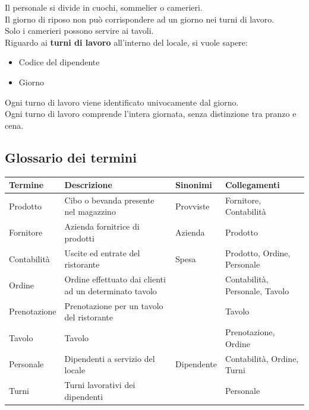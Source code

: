 Il personale si divide in cuochi, sommelier o camerieri.\\
Il giorno di riposo non può corrispondere ad un giorno nei turni di lavoro. \\
Solo i camerieri possono servire ai tavoli. \medskip \\
Riguardo ai \textbf{turni di lavoro} all’interno del locale, si vuole sapere:
\begin{itemize}
    \item Codice del dipendente
    \item Giorno
\end{itemize}
Ogni turno di lavoro viene identificato univocamente dal giorno.\\
Ogni turno di lavoro comprende l'intera giornata, senza distinzione tra pranzo e cena.
\subsection{Glossario dei termini}
\begin{longtable}{p{2.5cm} p{5.5cm} p{2cm} p{4cm}}
    \toprule
    \textbf{Termine} & \textbf{Descrizione} & \textbf{Sinonimi} & \textbf{Collegamenti}\\ \midrule
    Prodotto & Cibo o bevanda presente nel magazzino & Provviste & Fornitore, Contabilità \\ \midrule
    Fornitore & Azienda fornitrice di prodotti & Azienda & Prodotto \\ \midrule
    Contabilità & Uscite ed entrate del ristorante & Spesa & Prodotto, Ordine, Personale \\ \midrule
    Ordine & Ordine effettuato dai clienti ad un determinato tavolo & & Contabilità, Personale, Tavolo \\ \midrule
    Prenotazione & Prenotazione per un tavolo del ristorante & & Tavolo \\ \midrule
    Tavolo & Tavolo & & Prenotazione, Ordine\\ \midrule
    Personale & Dipendenti a servizio del locale & Dipendente & Contabilità, Ordine, Turni\\ \midrule
    Turni & Turni lavorativi dei dipendenti & & Personale	\\ \midrule
\end{longtable}

